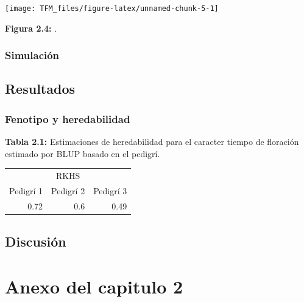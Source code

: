 \documentclass[11pt,spanish,a4paper,oneside,]{book} %
\begin{document}
\begin{center}\texttt{[image: TFM\_files/figure-latex/unnamed-chunk-5-1]} \end{center}

\begin{center}
\textbf{Figura 2.4:} .

\end{center}

\hypertarget{simulaciuxf3n}{%
\subsection{Simulación}\label{simulaciuxf3n}}

\hypertarget{results2}{%
\section{Resultados}\label{results2}}

\hypertarget{fenotipo-y-heredabilidad}{%
\subsection{Fenotipo y heredabilidad}\label{fenotipo-y-heredabilidad}}

\begin{center}
\textbf{Tabla 2.1:} Estimaciones de heredabilidad para el caracter tiempo de floración estimado por BLUP basado en el pedigrí.

\end{center}

\captionsetup[table]{labelformat=empty,skip=1pt}
\begin{longtable}{rrr}
\toprule
\multicolumn{3}{c}{RKHS} \\ 
 \cmidrule(lr){1-3}
Pedigrí 1 & Pedigrí 2 & Pedigrí 3 \\ 
\midrule
0.72 & 0.6 & 0.49 \\ 
 \bottomrule
\end{longtable}

\hypertarget{discussion2}{%
\section{Discusión}\label{discussion2}}

\hypertarget{appendix-appendix}{%
\appendix}


\hypertarget{anexo-del-capitulo-2}{%
\chapter{Anexo del capitulo 2}\label{anexo-del-capitulo-2}}
\end{document}
